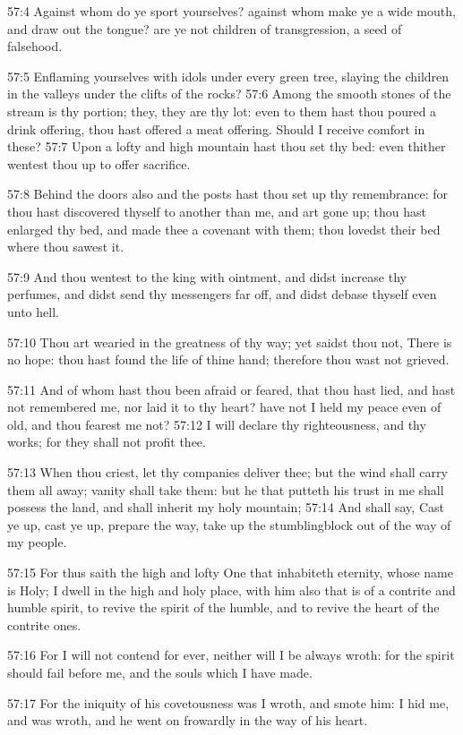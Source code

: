 57:4 Against whom do ye sport yourselves? against whom make ye a wide
mouth, and draw out the tongue? are ye not children of transgression,
a seed of falsehood.

57:5 Enflaming yourselves with idols under every green tree, slaying
the children in the valleys under the clifts of the rocks?  57:6 Among
the smooth stones of the stream is thy portion; they, they are thy
lot: even to them hast thou poured a drink offering, thou hast offered
a meat offering. Should I receive comfort in these?  57:7 Upon a lofty
and high mountain hast thou set thy bed: even thither wentest thou up
to offer sacrifice.

57:8 Behind the doors also and the posts hast thou set up thy
remembrance: for thou hast discovered thyself to another than me, and
art gone up; thou hast enlarged thy bed, and made thee a covenant with
them; thou lovedst their bed where thou sawest it.

57:9 And thou wentest to the king with ointment, and didst increase
thy perfumes, and didst send thy messengers far off, and didst debase
thyself even unto hell.

57:10 Thou art wearied in the greatness of thy way; yet saidst thou
not, There is no hope: thou hast found the life of thine hand;
therefore thou wast not grieved.

57:11 And of whom hast thou been afraid or feared, that thou hast
lied, and hast not remembered me, nor laid it to thy heart? have not I
held my peace even of old, and thou fearest me not?  57:12 I will
declare thy righteousness, and thy works; for they shall not profit
thee.

57:13 When thou criest, let thy companies deliver thee; but the wind
shall carry them all away; vanity shall take them: but he that putteth
his trust in me shall possess the land, and shall inherit my holy
mountain; 57:14 And shall say, Cast ye up, cast ye up, prepare the
way, take up the stumblingblock out of the way of my people.

57:15 For thus saith the high and lofty One that inhabiteth eternity,
whose name is Holy; I dwell in the high and holy place, with him also
that is of a contrite and humble spirit, to revive the spirit of the
humble, and to revive the heart of the contrite ones.

57:16 For I will not contend for ever, neither will I be always wroth:
for the spirit should fail before me, and the souls which I have made.

57:17 For the iniquity of his covetousness was I wroth, and smote him:
I hid me, and was wroth, and he went on frowardly in the way of his
heart.

